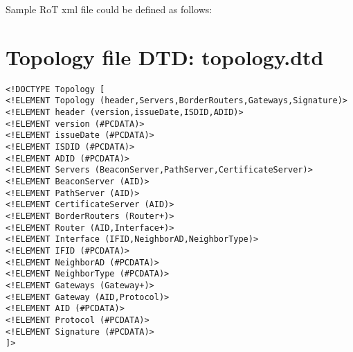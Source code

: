 Sample RoT xml file could be defined as follows:


\section{Topology file DTD: topology.dtd}
\label{sec:topologydtd}

\begin{verbatim}
<!DOCTYPE Topology [
<!ELEMENT Topology (header,Servers,BorderRouters,Gateways,Signature)>
<!ELEMENT header (version,issueDate,ISDID,ADID)>
<!ELEMENT version (#PCDATA)>
<!ELEMENT issueDate (#PCDATA)>
<!ELEMENT ISDID (#PCDATA)>
<!ELEMENT ADID (#PCDATA)>
<!ELEMENT Servers (BeaconServer,PathServer,CertificateServer)>
<!ELEMENT BeaconServer (AID)>
<!ELEMENT PathServer (AID)>
<!ELEMENT CertificateServer (AID)>
<!ELEMENT BorderRouters (Router+)>
<!ELEMENT Router (AID,Interface+)>
<!ELEMENT Interface (IFID,NeighborAD,NeighborType)>
<!ELEMENT IFID (#PCDATA)>
<!ELEMENT NeighborAD (#PCDATA)>
<!ELEMENT NeighborType (#PCDATA)>
<!ELEMENT Gateways (Gateway+)>
<!ELEMENT Gateway (AID,Protocol)>
<!ELEMENT AID (#PCDATA)>
<!ELEMENT Protocol (#PCDATA)>
<!ELEMENT Signature (#PCDATA)>
]>
\end{verbatim}


